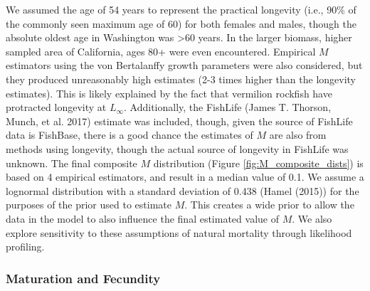 \documentclass[11pt,
  english,
  a4paper,
]{article}
\begin{document}
We assumed the age of 54 years to represent the practical longevity (i.e., 90\% of the commonly seen maximum age of 60) for both females and males, though the absolute oldest age in Washington was \textgreater60 years. In the larger biomass, higher sampled area of California, ages 80+ were even encountered. Empirical {\(M\)\leavevmode\tagmcend\tagstructend} estimators using the von Bertalanffy growth parameters were also considered, but they produced unreasonably high estimates (2-3 times higher than the longevity estimates). This is likely explained by the fact that vermilion rockfish have protracted longevity at {\(L_{\infty}\)\leavevmode\tagmcend\tagstructend}. Additionally, the FishLife {(James T. Thorson, Munch, et al. 2017)\leavevmode\tagmcend\tagstructend} estimate was included, though, given the source of FishLife data is FishBase, there is a good chance the estimates of {\(M\)\leavevmode\tagmcend\tagstructend} are also from methods using longevity, though the actual source of longevity in FishLife was unknown. The final composite {\(M\)\leavevmode\tagmcend\tagstructend} distribution (Figure \ref{fig:M_composite_dists}) is based on 4 empirical estimators, and result in a median value of 0.1. We assume a lognormal distribution with a standard deviation of 0.438 ({Hamel (2015)\leavevmode\tagmcend\tagstructend}) for the purposes of the prior used to estimate {\(M\)\leavevmode\tagmcend\tagstructend}. This creates a wide prior to allow the data in the model to also influence the final estimated value of {\(M\)\leavevmode\tagmcend\tagstructend}. We also explore sensitivity to these assumptions of natural mortality through likelihood profiling.

\leavevmode\tagmcend\tagstructend\par


\hypertarget{maturation-and-fecundity}{%
\subsubsection{Maturation and Fecundity}\label{maturation-and-fecundity}}
\end{document}
